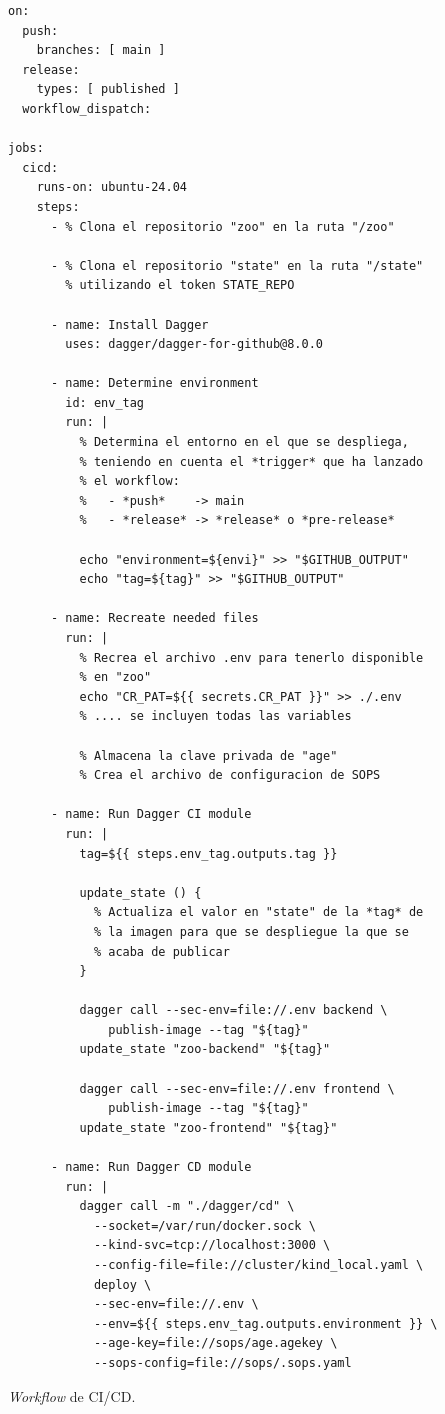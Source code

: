\begin{longlisting}
  \begin{verbatim}
on:
  push:
    branches: [ main ]
  release:
    types: [ published ]
  workflow_dispatch:

jobs:
  cicd:
    runs-on: ubuntu-24.04
    steps:
      - % Clona el repositorio "zoo" en la ruta "/zoo"

      - % Clona el repositorio "state" en la ruta "/state"
        % utilizando el token STATE_REPO

      - name: Install Dagger
        uses: dagger/dagger-for-github@8.0.0

      - name: Determine environment
        id: env_tag
        run: |
          % Determina el entorno en el que se despliega,
          % teniendo en cuenta el *trigger* que ha lanzado
          % el workflow:
          %   - *push*    -> main
          %   - *release* -> *release* o *pre-release*

          echo "environment=${envi}" >> "$GITHUB_OUTPUT"
          echo "tag=${tag}" >> "$GITHUB_OUTPUT"

      - name: Recreate needed files
        run: |
          % Recrea el archivo .env para tenerlo disponible
          % en "zoo"
          echo "CR_PAT=${{ secrets.CR_PAT }}" >> ./.env
          % .... se incluyen todas las variables

          % Almacena la clave privada de "age"
          % Crea el archivo de configuracion de SOPS

      - name: Run Dagger CI module
        run: |
          tag=${{ steps.env_tag.outputs.tag }} 

          update_state () {
            % Actualiza el valor en "state" de la *tag* de
            % la imagen para que se despliegue la que se
            % acaba de publicar
          }

          dagger call --sec-env=file://.env backend \
              publish-image --tag "${tag}"
          update_state "zoo-backend" "${tag}"

          dagger call --sec-env=file://.env frontend \
              publish-image --tag "${tag}"
          update_state "zoo-frontend" "${tag}"

      - name: Run Dagger CD module
        run: |
          dagger call -m "./dagger/cd" \
            --socket=/var/run/docker.sock \
            --kind-svc=tcp://localhost:3000 \
            --config-file=file://cluster/kind_local.yaml \
            deploy \
            --sec-env=file://.env \
            --env=${{ steps.env_tag.outputs.environment }} \
            --age-key=file://sops/age.agekey \
            --sops-config=file://sops/.sops.yaml
  \end{verbatim}
  \caption{\textit{Workflow} de CI/CD.}
  \label{lst:workflowcicd}
\end{longlisting}

